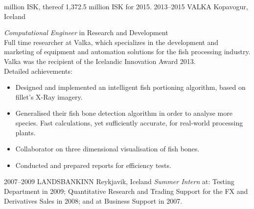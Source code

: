 \documentclass[]{cv} %
\begin{document}
\begin{entrylist}
{million ISK, thereof 1,372.5 million ISK for 2015.
}
\entry
{2013--2015}
{VALKA}
{Kopavogur, Iceland}
{\emph{Computational Engineer} in Research and Development \\
Full time researcher at Valka, which specializes in the development and market\-ing of equipment and automation solutions for the fish processing industry. Valka was the recipient of the Icelandic Innovation Award 2013. \\
Detailed achievements:
\begin{itemize}
\item Designed and implemented an intelligent fish portioning algorithm, based 
on fillet's X-Ray imagery. 
\item Generalised their fish bone detection algorithm in order to analyse more species. Fast calculations, yet sufficiently accurate, for real-world processing plants.
\item Collaborator on three dimensional visualisation of fish bones.
\item Conducted and prepared reports for efficiency tests.
\end{itemize}
}
\entry
{2007--2009}
{LANDSBANKINN}
{Reykjavik, Iceland}
{
\emph{Summer Intern} at: Testing Department in 2009; Quantitative Research and Trading Support for the FX and Derivatives Sales in 2008; and at Business Support in 2007.
}
\end{entrylist}
\end{document}
